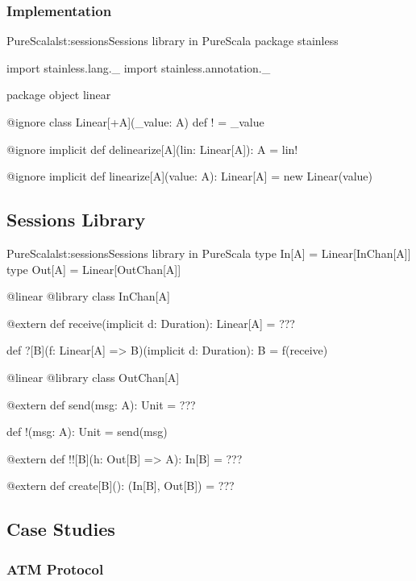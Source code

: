 \documentclass[a4paper,twoside]{article}
\begin{document}
\subsubsection{Implementation}

\begin{Code}{PureScala}{lst:sessions}{Sessions library in PureScala}
package stainless

import stainless.lang._
import stainless.annotation._

package object linear {

  @ignore
  class Linear[+A](_value: A) {
    def ! = _value
  }

  @ignore
  implicit def delinearize[A](lin: Linear[A]): A = lin!

  @ignore
  implicit def linearize[A](value: A): Linear[A] = new Linear(value)

}
\end{Code}

\subsection{Sessions Library}
\label{sessions_lib}

\begin{Code}{PureScala}{lst:sessions}{Sessions library in PureScala}
type In[A]  = Linear[InChan[A]]
type Out[A] = Linear[OutChan[A]]

@linear @library
class InChan[A] {

  @extern
  def receive(implicit d: Duration): Linear[A] = {
    ???
  }

  def ?[B](f: Linear[A] => B)(implicit d: Duration): B = {
    f(receive)
  }
}

@linear @library
class OutChan[A] {

  @extern
  def send(msg: A): Unit = {
    ???
  }

  def !(msg: A): Unit = {
    send(msg)
  }

  @extern
  def !![B](h: Out[B] => A): In[B] = {
    ???
  }

  @extern
  def create[B](): (In[B], Out[B]) = {
    ???
  }
}
\end{Code}

\subsection{Case Studies}

\subsubsection{ATM Protocol}
\end{document}
